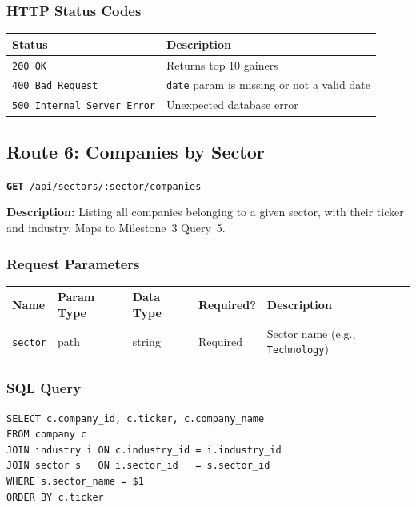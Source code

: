 \documentclass[11pt]{article}
\newcommand{\route}[2]{\texttt{\textcolor{routecolor}{\textbf{#1}}~#2}}
\begin{document}
\subsubsection*{HTTP Status Codes}

\begin{center}
\small
\begin{tabular}{l p{8cm}}
\toprule
\textbf{Status} & \textbf{Description} \\
\midrule
\texttt{200 OK} & Returns top 10 gainers \\
\texttt{400 Bad Request} & \texttt{date} param is missing or not a valid date \\
\texttt{500 Internal Server Error} & Unexpected database error \\
\bottomrule
\end{tabular}
\end{center}

\newpage
\subsection{Route 6: Companies by Sector}

\route{GET}{/api/sectors/:sector/companies}

\medskip\noindent
\textbf{Description:} Listing all companies belonging to a given sector, with their ticker and industry. Maps to Milestone~3 Query~5.

\subsubsection*{Request Parameters}

\begin{center}
\small
\begin{tabular}{l l l l p{5cm}}
\toprule
\textbf{Name} & \textbf{Param Type} & \textbf{Data Type} & \textbf{Required?} & \textbf{Description} \\
\midrule
\texttt{sector} & path & string & Required & Sector name (e.g., \texttt{Technology}) \\
\bottomrule
\end{tabular}
\end{center}

\subsubsection*{SQL Query}
\begin{lstlisting}[style=sql,basicstyle=\ttfamily\scriptsize]
SELECT c.company_id, c.ticker, c.company_name
FROM company c
JOIN industry i ON c.industry_id = i.industry_id
JOIN sector s   ON i.sector_id   = s.sector_id
WHERE s.sector_name = $1
ORDER BY c.ticker
\end{lstlisting}
\end{document}
